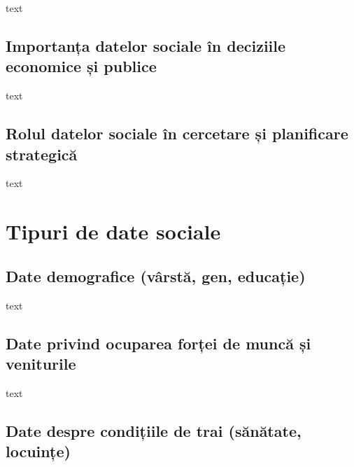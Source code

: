 \documentclass[
  11pt,
  b5paper,
  nottoc]{book}
\begin{document}
text

\hypertarget{importanux21ba-datelor-sociale-uxeen-deciziile-economice-ux219i-publice}{%
\subsection{Importanța datelor sociale în deciziile economice și
publice}\label{importanux21ba-datelor-sociale-uxeen-deciziile-economice-ux219i-publice}}

text

\hypertarget{rolul-datelor-sociale-uxeen-cercetare-ux219i-planificare-strategicux103}{%
\subsection{Rolul datelor sociale în cercetare și planificare
strategică}\label{rolul-datelor-sociale-uxeen-cercetare-ux219i-planificare-strategicux103}}

text

\hypertarget{tipuri-de-date-sociale}{%
\section{Tipuri de date sociale}\label{tipuri-de-date-sociale}}

\hypertarget{date-demografice-vuxe2rstux103-gen-educaux21bie}{%
\subsection{Date demografice (vârstă, gen,
educație)}\label{date-demografice-vuxe2rstux103-gen-educaux21bie}}

text

\hypertarget{date-privind-ocuparea-forux21bei-de-muncux103-ux219i-veniturile}{%
\subsection{Date privind ocuparea forței de muncă și
veniturile}\label{date-privind-ocuparea-forux21bei-de-muncux103-ux219i-veniturile}}

text

\hypertarget{date-despre-condiux21biile-de-trai-sux103nux103tate-locuinux21be}{%
\subsection{Date despre condițiile de trai (sănătate,
locuințe)}\label{date-despre-condiux21biile-de-trai-sux103nux103tate-locuinux21be}}
\end{document}
